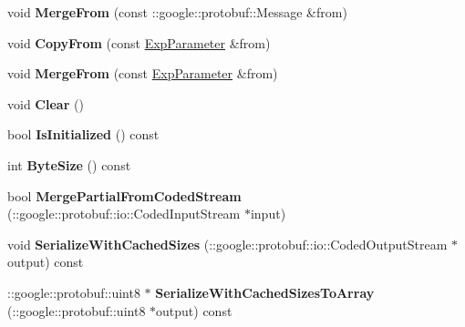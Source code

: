 \begin{DoxyCompactItemize}
void {\bfseries Merge\+From} (const \+::google\+::protobuf\+::\+Message \&from)
\item 
\mbox{\label{classcaffe_1_1_exp_parameter_a8512381c6810db486e9cf4e6fd62234b}} 
void {\bfseries Copy\+From} (const \mbox{\hyperlink{classcaffe_1_1_exp_parameter}{Exp\+Parameter}} \&from)
\item 
\mbox{\label{classcaffe_1_1_exp_parameter_a30813661b5e0daa0ea4b8d7711407dcb}} 
void {\bfseries Merge\+From} (const \mbox{\hyperlink{classcaffe_1_1_exp_parameter}{Exp\+Parameter}} \&from)
\item 
\mbox{\label{classcaffe_1_1_exp_parameter_ac01c491b45f99b795867009b2f055e54}} 
void {\bfseries Clear} ()
\item 
\mbox{\label{classcaffe_1_1_exp_parameter_a6994d792a79092de32bde865973e218c}} 
bool {\bfseries Is\+Initialized} () const
\item 
\mbox{\label{classcaffe_1_1_exp_parameter_a25bfb4a81375ab6fd474249cf7470332}} 
int {\bfseries Byte\+Size} () const
\item 
\mbox{\label{classcaffe_1_1_exp_parameter_ab9ba9dff15300979236b19a3dfbed1be}} 
bool {\bfseries Merge\+Partial\+From\+Coded\+Stream} (\+::google\+::protobuf\+::io\+::\+Coded\+Input\+Stream $\ast$input)
\item 
\mbox{\label{classcaffe_1_1_exp_parameter_a55a8087fb0c26905179e82dfdfcc0026}} 
void {\bfseries Serialize\+With\+Cached\+Sizes} (\+::google\+::protobuf\+::io\+::\+Coded\+Output\+Stream $\ast$output) const
\item 
\mbox{\label{classcaffe_1_1_exp_parameter_ab4beda3881d9378d4abe9da1e7768c4b}} 
\+::google\+::protobuf\+::uint8 $\ast$ {\bfseries Serialize\+With\+Cached\+Sizes\+To\+Array} (\+::google\+::protobuf\+::uint8 $\ast$output) const
\item 
\mbox{\label{classcaffe_1_1_exp_parameter_ab35f87186595977518cfe2cfaa40c342}} 

\end{DoxyCompactItemize}
